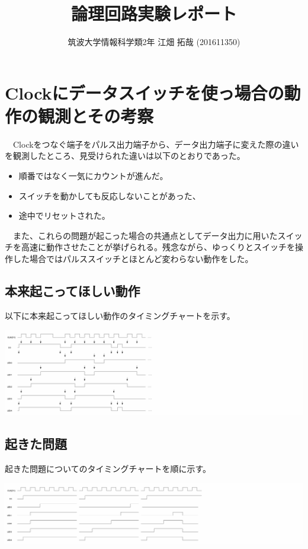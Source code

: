 \documentclass{scrartcl}
\author{筑波大学情報科学類2年 江畑 拓哉 (201611350)}
\date{}
\title{論理回路実験レポート}
\begin{document}
\maketitle
\section{Clockにデータスイッチを使っ場合の動作の観測とその考察}
\label{sec:org5a22e70}
　Clockをつなぐ端子をパルス出力端子から、データ出力端子に変えた際の違いを観測したところ、見受けられた違いは以下のとおりであった。\\
\begin{itemize}
\item 順番ではなく一気にカウントが進んだ。\\
\item スイッチを動かしても反応しないことがあった、\\
\item 途中でリセットされた。\\
\end{itemize}
　また、これらの問題が起こった場合の共通点としてデータ出力に用いたスイッチを高速に動作させたことが挙げられる。残念ながら、ゆっくりとスイッチを操作した場合ではパルススイッチとほとんど変わらない動作をした。\\
\subsection{本来起こってほしい動作}
\label{sec:org42e7d1c}
以下に本来起こってほしい動作のタイミングチャートを示す。\\
\begin{center}
\includegraphics[width=1.5\linewidth]{flowchart1.png}
\end{center}


\subsection{起きた問題}
\label{sec:org26566d7}
起きた問題についてのタイミングチャートを順に示す。\\
\begin{center}
\includegraphics[width=1.5\linewidth]{flowchart2.png}
\end{center}
\end{document}
